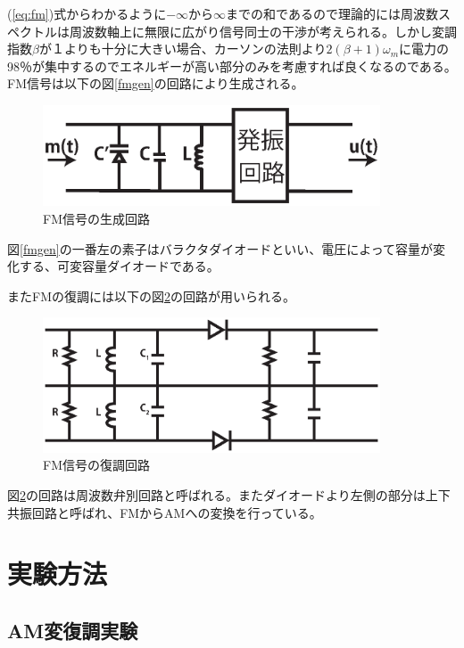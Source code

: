 \documentclass[11pt,a4j]{jsarticle}
\begin{document}
(\ref{eq:fm})式からわかるように$-\infty$から$\infty$までの和であるので理論的には周波数スペクトルは周波数軸上に無限に広がり信号同士の干渉が考えられる。しかし変調指数$\beta$が１よりも十分に大きい場合、カーソンの法則より$2(\beta + 1)\omega_m$に電力の98％が集中するのでエネルギーが高い部分のみを考慮すれば良くなるのである。
FM信号は以下の図\ref{fmgen}の回路により生成される。

\begin{figure}[H]
\begin{center}
	\includegraphics[clip, width=100mm]{fm_gen.eps}
	\caption{FM信号の生成回路}
	\label{fmmo}
\end{center}
\end{figure}

図\ref{fmgen}の一番左の素子はバラクタダイオードといい、電圧によって容量が変化する、可変容量ダイオードである。

またFMの復調には以下の図\ref{fmdemo}の回路が用いられる。
\begin{figure}[H]
\begin{center}
	\includegraphics[clip, width=100mm]{fm_demo.eps}
	\caption{FM信号の復調回路}
	\label{fmdemo}
\end{center}
\end{figure}

図\ref{fmdemo}の回路は周波数弁別回路と呼ばれる。またダイオードより左側の部分は上下共振回路と呼ばれ、FMからAMへの変換を行っている。

\section{実験方法}

\subsection{AM変復調実験}
\end{document}
